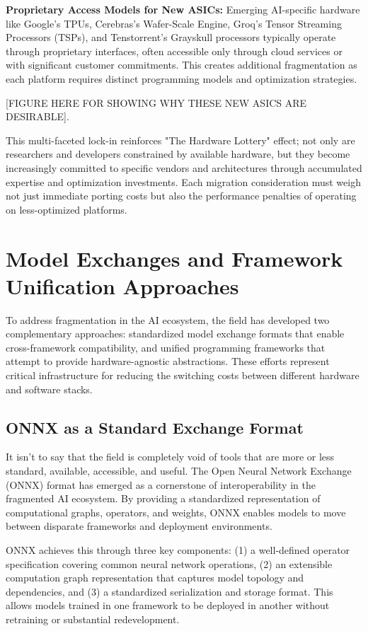 \documentclass[manuscript,screen,review,format=acmsmall]{acmart}
\begin{document}
\textbf{Proprietary Access Models for New ASICs:} Emerging AI-specific hardware like Google's TPUs, Cerebras's Wafer-Scale Engine, Groq's Tensor Streaming Processors (TSPs), and Tenstorrent's Grayskull processors typically operate through proprietary interfaces, often accessible only through cloud services or with significant customer commitments. This creates additional fragmentation as each platform requires distinct programming models and optimization strategies.

[FIGURE HERE FOR SHOWING WHY THESE NEW ASICS ARE DESIRABLE].

This multi-faceted lock-in reinforces "The Hardware Lottery" effect; not only are researchers and developers constrained by available hardware, but they become increasingly committed to specific vendors and architectures through accumulated expertise and optimization investments. Each migration consideration must weigh not just immediate porting costs but also the performance penalties of operating on less-optimized platforms.

\section{Model Exchanges and Framework Unification Approaches}

To address fragmentation in the AI ecosystem, the field has developed two complementary approaches: standardized model exchange formats that enable cross-framework compatibility, and unified programming frameworks that attempt to provide hardware-agnostic abstractions. These efforts represent critical infrastructure for reducing the switching costs between different hardware and software stacks.

\subsection{ONNX as a Standard Exchange Format}

It isn’t to say that the field is completely void of tools that are more or less standard, available, accessible, and useful. The Open Neural Network Exchange (ONNX) format has emerged as a cornerstone of interoperability in the fragmented AI ecosystem. By providing a standardized representation of computational graphs, operators, and weights, ONNX enables models to move between disparate frameworks and deployment environments. 


ONNX achieves this through three key components: (1) a well-defined operator specification covering common neural network operations, (2) an extensible computation graph representation that captures model topology and dependencies, and (3) a standardized serialization and storage format. This allows models trained in one framework to be deployed in another without retraining or substantial redevelopment.
\end{document}
